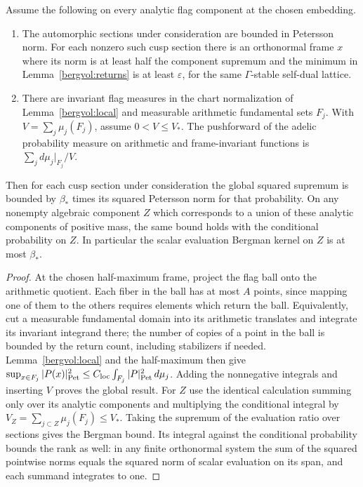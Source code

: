 \begin{proposition}\label{bergvol:global}
Assume the following on every analytic flag component at the chosen
embedding.
\begin{enumerate}
\item The automorphic sections under consideration are bounded in
Petersson norm. For each nonzero such cusp section there is an
orthonormal frame \(x\) where its norm is at least half the component
supremum and the minimum in Lemma~\ref{bergvol:returns} is at least
\(\varepsilon\), for the same \(\Gamma\)-stable self-dual lattice.
\item There are invariant flag measures in the chart normalization
of Lemma~\ref{bergvol:local} and measurable arithmetic fundamental
sets \(F_j\). With \(V=\sum_j\mu_j(F_j)\), assume \(0<V\le V_*\).
The pushforward of the adelic probability measure on arithmetic
and frame-invariant functions is \(\sum_j d\mu_j|_{F_j}/V\).
\end{enumerate}
Then for each cusp section under consideration the global squared supremum
is bounded by \(\beta_*\) times its squared Petersson norm for that probability. On any nonempty
algebraic component \(Z\) which corresponds to a union of these
analytic components of positive mass, the same bound holds with
the conditional probability on \(Z\). In particular the scalar
evaluation Bergman kernel on \(Z\) is at most \(\beta_*\).
\end{proposition}
\begin{proof}
At the chosen half-maximum frame, project the flag ball onto the
arithmetic quotient. Each fiber in the ball has at most \(A\)
points, since mapping one of them to the others requires elements
which return the ball. Equivalently, cut a measurable fundamental
domain into its arithmetic translates and integrate its invariant
integrand there; the number of copies of a point in the ball is
bounded by the return count, including stabilizers if needed.
Lemma~\ref{bergvol:local} and the half-maximum then give
\(\sup_{x\in F_j}|P(x)|_{\rm Pet}^2\le C_{\rm loc}
\int_{F_j}|P|_{\rm Pet}^2\,d\mu_j\).
Adding the nonnegative integrals and inserting \(V\) proves the
global result. For \(Z\) use the identical calculation summing only
over its analytic components and multiplying the conditional
integral by \(V_Z=\sum_{j\subset Z}\mu_j(F_j)\le V_*\).
Taking the supremum of the evaluation ratio over sections gives
the Bergman bound. Its integral against the conditional probability
bounds the rank as well: in any finite orthonormal system the sum
of the squared pointwise norms equals the squared norm of scalar
evaluation on its span, and each summand integrates to one.
\end{proof}

